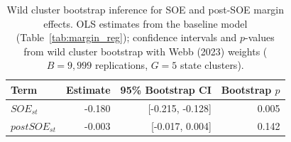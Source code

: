 \begin{table}[!h]
\centering
\caption{\label{tab:tab:margin_wcb}Wild cluster bootstrap inference for SOE and post-SOE margin effects. OLS estimates from the baseline model (Table~\ref{tab:margin_reg}); confidence intervals and $p$-values from wild cluster bootstrap with Webb (2023) weights ($B = 9{,}999$ replications, $G = 5$ state clusters).}
\centering
\begin{tabular}[t]{lrrr}
\toprule
Term & Estimate & 95\% Bootstrap CI & Bootstrap $p$\\
\midrule
$SOE_{st}$ & -0.180 & {}[-0.215, -0.128] & 0.005\\
$postSOE_{st}$ & -0.003 & {}[-0.017, 0.004] & 0.142\\
\bottomrule
\end{tabular}
\end{table}
